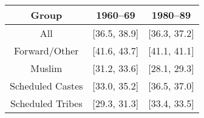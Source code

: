 \begin{tabular}{ccc} 
\hline
\hline
Group & 1960--69 & 1980--89 \\
\hline 
All & [36.5, 38.9] &
[36.3, 37.2] \\
Forward/Other & [41.6, 43.7] &
[41.1, 41.1] \\
Muslim & [31.2, 33.6] & [28.1, 29.3] \\
Scheduled Castes & [33.0, 35.2] & [36.5, 37.0] \\
Scheduled Tribes & [29.3, 31.3] & [33.4, 33.5] \\
\hline
\hline 
\end{tabular}
